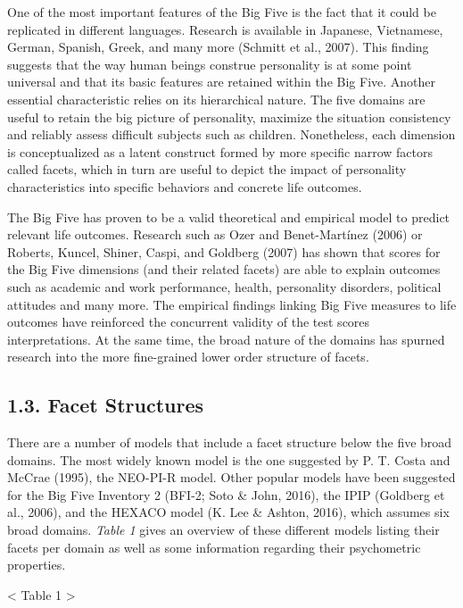\documentclass[,man,floatsintext]{apa6}
\begin{document}
One of the most important features of the Big Five is the fact that it
could be replicated in different languages. Research is available in
Japanese, Vietnamese, German, Spanish, Greek, and many more (Schmitt et
al., 2007). This finding suggests that the way human beings construe
personality is at some point universal and that its basic features are
retained within the Big Five. Another essential characteristic relies on
its hierarchical nature. The five domains are useful to retain the big
picture of personality, maximize the situation consistency and reliably
assess difficult subjects such as children. Nonetheless, each dimension
is conceptualized as a latent construct formed by more specific narrow
factors called facets, which in turn are useful to depict the impact of
personality characteristics into specific behaviors and concrete life
outcomes.

The Big Five has proven to be a valid theoretical and empirical model to
predict relevant life outcomes. Research such as Ozer and Benet-Martínez
(2006) or Roberts, Kuncel, Shiner, Caspi, and Goldberg (2007) has shown
that scores for the Big Five dimensions (and their related facets) are
able to explain outcomes such as academic and work performance, health,
personality disorders, political attitudes and many more. The empirical
findings linking Big Five measures to life outcomes have reinforced the
concurrent validity of the test scores interpretations. At the same
time, the broad nature of the domains has spurned research into the more
fine-grained lower order structure of facets.

\subsection{1.3. Facet Structures}\label{facet-structures}

There are a number of models that include a facet structure below the
five broad domains. The most widely known model is the one suggested by
P. T. Costa and McCrae (1995), the NEO-PI-R model. Other popular models
have been suggested for the Big Five Inventory 2 (BFI-2; Soto \& John,
2016), the IPIP (Goldberg et al., 2006), and the HEXACO model (K. Lee \&
Ashton, 2016), which assumes six broad domains. \emph{Table 1} gives an
overview of these different models listing their facets per domain as
well as some information regarding their psychometric properties.

\vspace{5mm}

\textless{} Table 1 \textgreater{}
\end{document}
